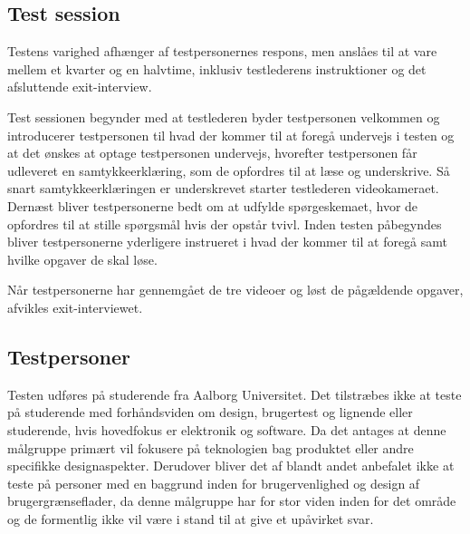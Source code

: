 \subsection{Test session}
\label{TestSessionValgAfGestikker}
%
Testens varighed afhænger af testpersonernes respons, men anslåes til at vare mellem et kvarter og en halvtime, inklusiv testlederens instruktioner og det afsluttende exit-interview.

Test sessionen begynder med at testlederen byder testpersonen velkommen og introducerer testpersonen til hvad der kommer til at foregå undervejs i testen og at det ønskes at optage testpersonen undervejs, hvorefter testpersonen får udleveret en samtykkeerklæring, som de opfordres til at læse og underskrive. Så snart samtykkeerklæringen er underskrevet starter testlederen videokameraet. Dernæst bliver testpersonerne bedt om at udfylde spørgeskemaet, hvor de opfordres til at stille spørgsmål hvis der opstår tvivl. Inden testen påbegyndes bliver testpersonerne yderligere instrueret i hvad der kommer til at foregå samt hvilke opgaver de skal løse. 

Når testpersonerne har gennemgået de tre videoer og løst de pågældende opgaver, afvikles exit-interviewet. 
%

\subsection{Testpersoner}
\label{TestpersonerValgAfGestikker}
%
Testen udføres på studerende fra Aalborg Universitet. Det tilstræbes ikke at teste på studerende med forhåndsviden om design, brugertest og lignende eller studerende, hvis hovedfokus er elektronik og software. Da det antages at denne målgruppe primært vil fokusere på teknologien bag produktet eller andre specifikke designaspekter. Derudover bliver det af \textcite[s. 110]{Book:OUE} blandt andet anbefalet ikke at teste på personer med en baggrund inden for brugervenlighed og design af brugergrænseflader, da denne målgruppe har for stor viden inden for det område og de formentlig ikke vil være i stand til at give et upåvirket svar.

